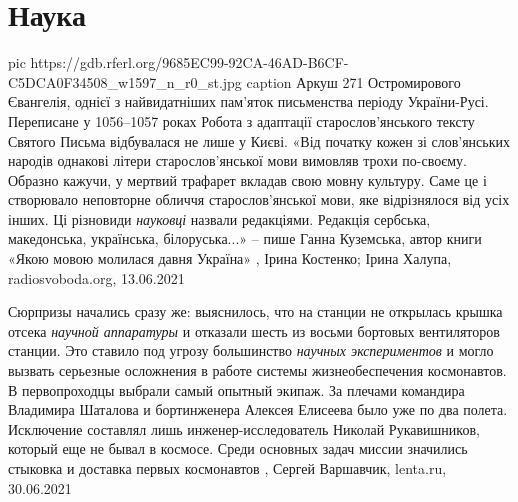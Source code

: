  
 
 
 
 
\chapter{Наука}
\label{sec:slova.nauka}

\ifcmt
  pic https://gdb.rferl.org/9685EC99-92CA-46AD-B6CF-C5DCA0F34508_w1597_n_r0_st.jpg
	caption Аркуш 271 Остромирового Євангелія, однієї з найвидатніших пам'яток письменства періоду України-Русі. Переписане у 1056–1057 роках
\fi
Робота з адаптації старослов'янського тексту Святого Письма відбувалася не лише
у Києві. «Від початку кожен зі слов'янських народів однакові літери
старослов'янської мови вимовляв трохи по-своєму. Образно кажучи, у мертвий
трафарет вкладав свою мовну культуру. Саме це і створювало неповторне обличчя
старослов'янської мови, яке відрізнялося від усіх інших. Ці різновиди
\emph{науковці} назвали редакціями. Редакція сербська, македонська, українська,
білоруська...» – пише Ганна Куземська, автор книги «Якою мовою молилася давня
Україна»
,
Ірина Костенко; Ірина Халупа, radiosvoboda.org, 13.06.2021

Сюрпризы начались сразу же: выяснилось, что на станции не открылась крышка
отсека \emph{научной аппаратуры} и отказали шесть из восьми бортовых вентиляторов
станции. Это ставило под угрозу большинство \emph{научных экспериментов} и могло
вызвать серьезные осложнения в работе системы жизнеобеспечения космонавтов.  В
первопроходцы выбрали самый опытный экипаж. За плечами командира Владимира
Шаталова и бортинженера Алексея Елисеева было уже по два полета. Исключение
составлял лишь инженер-исследователь Николай Рукавишников, который еще не бывал
в космосе. Среди основных задач миссии значились стыковка и доставка первых
космонавтов
, Сергей Варшавчик, lenta.ru, 30.06.2021


